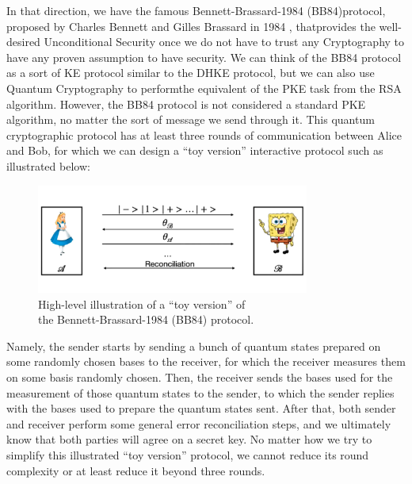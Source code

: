 \documentclass[12pt]{article}
\begin{document}
    \noindent In that direction, we have the famous Bennett-Brassard-1984 (BB84)\break protocol, proposed by Charles Bennett and Gilles Brassard in 1984 \cite{bennett-brassard:quantum-cryptography-public-key-distribution-coin-tossing:1984:03-2024,bennett-brassard:quantum-cryptography-public-key-distribution-coin-tossing:2014:03-2024}, that\break provides the well-desired Unconditional Security once we do not have to trust any Cryptography to have any proven assumption to have security. We can think of the BB84 protocol as a sort of KE protocol similar to the DH\break KE protocol, but we can also use Quantum Cryptography to perform\break the equivalent of the PKE task from the RSA algorithm. However, the BB84 protocol is not considered a standard PKE algorithm, no matter the sort of message we send through it. This quantum cryptographic protocol has at least three rounds of communication between Alice and Bob, for which we can design a ``toy version'' interactive protocol such as illustrated below:

    \vspace{-2ex}
    \begin{figure}[ht]
        \captionsetup{justification=centering}
        \centering
        \includegraphics[width=0.8\textwidth]{figures/images/img-1.pdf}
        \caption{High-level illustration of a ``toy version'' of\\ the Bennett-Brassard-1984 (BB84) protocol.}
    \end{figure}
    
    \noindent Namely, the sender starts by sending a bunch of quantum states prepared on some randomly chosen bases to the receiver, for which the receiver measures them on some basis randomly chosen. Then, the receiver sends the bases used for the measurement of those quantum states to the sender, to which the sender replies with the bases used to prepare the quantum states sent. After that, both sender and receiver perform some general error reconciliation steps, and we ultimately know that both parties will agree on a secret key. No matter how we try to simplify this illustrated ``toy version'' protocol, we cannot reduce its round complexity or at least reduce it beyond three rounds.
\end{document}
